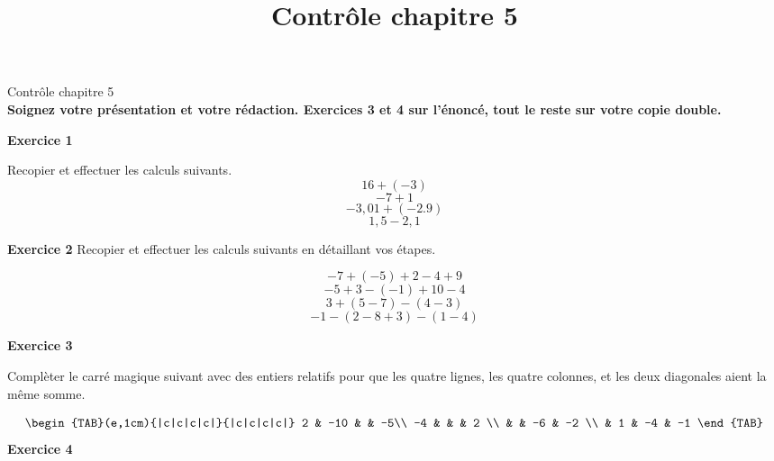 \documentclass[14pt]{extreport}
\title{Contrôle chapitre 5}
\date{}
\theoremstyle{plain}
\begin{document}
\begin{center}{\Large Contrôle chapitre 5}\\ \textbf{Soignez votre présentation et votre rédaction.
Exercices 3 et 4 sur l'énoncé, tout le reste sur votre copie double.}\end{center}

\textbf{Exercice 1}  %

Recopier et effectuer les calculs suivants. 
\[ 1 6+ (-3) \]
\[ -7 + 1\]
\[ -3,01 + (-2.9)\]
\[ 1,5 - 2,1\]

\textbf{Exercice 2} %
Recopier et effectuer les calculs suivants en détaillant vos étapes. 

\[ -7 + (-5) + 2 - 4 + 9 \]
\[ -5 + 3 - (-1) + 10 - 4\]
\[ 3 + (5 - 7) - (4 -3) \]
\[ -1 - (2 - 8 + 3) - (1 -4)\]




\textbf{Exercice 3} %

Complèter le carré magique suivant avec des entiers relatifs pour que les quatre lignes, les quatre colonnes, 
et les deux diagonales aient la même somme. 


\[
\begin{TAB}(e,1cm){|c|c|c|c|}{|c|c|c|c|}
     2 & -10 &  & -5\\
     -4 &  &  & 2 \\
     &  & -6 & -2 \\
     & 1 & -4 & -1
\end{TAB}
\]
%
\textbf{Exercice 4} 
 
\end{document}
